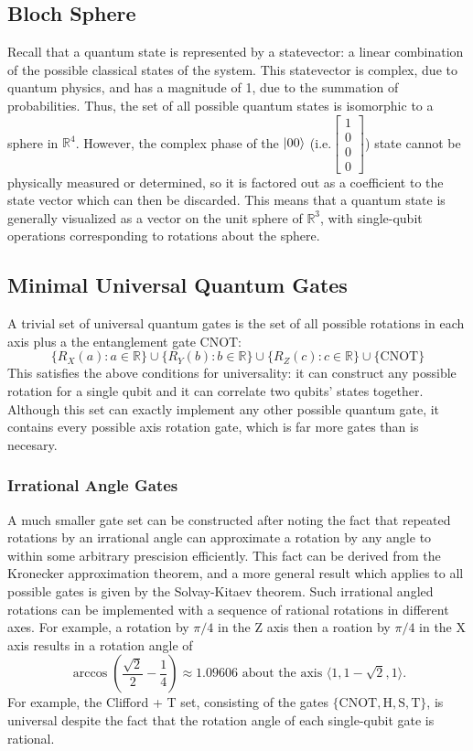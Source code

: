 \documentclass[12pt]{article}
\begin{document}
\subsection{Bloch Sphere}
Recall that a quantum state is represented by a statevector: a linear combination of the possible classical states of the system. This statevector is complex, due to quantum physics, and has a magnitude of 1, due to the summation of probabilities. Thus, the set of all possible quantum states is isomorphic to a sphere in $\mathbb{R}^4$. However, the complex phase of the  $\ket{00}$ (i.e.$\left[\begin{smallmatrix} 1 \\ 0 \\ 0 \\ 0 \end{smallmatrix}\right]$) state cannot be physically measured or determined, so it is factored out as a coefficient to the state vector which can then be discarded. This means that a quantum state is generally visualized as a vector on the unit sphere of $\mathbb{R}^3$, with single-qubit operations corresponding to rotations about the sphere.

\subsection{Minimal Universal Quantum Gates}
A trivial set of universal quantum gates is the set of all possible rotations in each axis plus a the entanglement gate CNOT:
$$\{R_X(a) : a \in \mathbb{R}\} \cup \{R_Y(b) : b \in \mathbb{R}\} \cup \{R_Z(c) : c \in \mathbb{R}\} \cup \{\text{CNOT}\}$$
This satisfies the above conditions for universality: it can construct any possible rotation for a single qubit and it can correlate two qubits' states together. Although this set can exactly implement any other possible quantum gate, it contains every possible axis rotation gate, which is far more gates than is necesary.

\subsubsection{Irrational Angle Gates}
A much smaller gate set can be constructed after noting the fact that repeated rotations by an irrational angle can approximate a rotation by any angle to within some arbitrary prescision efficiently. This fact can be derived from the Kronecker approximation theorem, and a more general result which applies to all possible gates is given by the Solvay-Kitaev theorem.
Such irrational angled rotations can be implemented with a sequence of rational rotations in different axes. For example, a rotation by $\pi/4$ in the Z axis then a roation by $\pi / 4$ in the X axis results in a rotation angle of
$$\arccos\left(\frac{\sqrt{2}}{2} - \frac{1}{4}\right) \approx 1.09606 \text{ about the axis } \langle 1, 1 - \sqrt{2}, 1 \rangle \text{.}$$
For example, the Clifford + T set, consisting of the gates $\{\text{CNOT}, \text{H}, \text{S}, \text{T}\}$, is universal despite the fact that the rotation angle of each single-qubit gate is rational.
\end{document}
